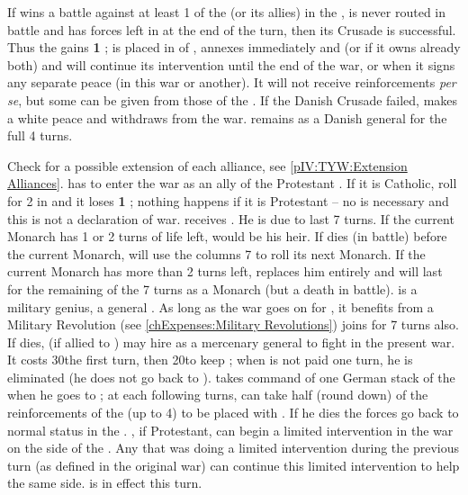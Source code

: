 \bparag If \DANdan wins a battle against at least 1 \ARMY\faceplus of the
\ligue (or its allies) in the \HRE, is never routed in battle and has forces
left in \HRE at the end of the turn, then its Crusade is successful.
\bparag Thus the \alliance gains {\bf 1} \STAB ; \DANmin is placed in \EG of
\ENG, annexes immediately \provinceLubeck and \provinceHolstein (or
\provinceMecklenburg if it owns already both) and will continue its
intervention until the end of the war, or when it signs any separate peace (in
this war or another). It will not receive reinforcements \emph{per se}, but
some can be given from those of the \alliance.
\bparag If the Danish Crusade failed, \DANmin makes a white peace and
withdraws from the war.  remains as a Danish general for
the full 4 turns.


\phevnt
\aparag Check for a possible extension of each alliance, see
\ref{pIV:TYW:Extension Alliances}.
\aparag \SUE has to enter the war as an ally of the Protestant \alliance.  If
it is Catholic, roll for 2 \REVOLT in \SUE and it loses {\bf 1} \STAB ;
nothing happens if it is Protestant -- no \CB is necessary and this is not a
declaration of war.
 \SUE receives . He is
due to last 7 turns.
\bparag If the current Monarch has 1 or 2 turns of life left,
 would be his heir. If 
dies (in battle) before the current Monarch, \SUE will use the columns 7 to
roll its next Monarch.
\bparag If the current Monarch has more than 2 turns left,  replaces him entirely and will last for the remaining of the 7
turns as a Monarch (but a death in battle).
\bparag {} is a military genius, a general
. As long as the war goes on for \SUE, it
benefits from a Military Revolution (see \ref{chExpenses:Military
  Revolutions})
\label{pIV:TYW:Saxe-Weimar}
 joins \SUE for 7 turns also.
\bparag If  dies, \FRA (if allied to \SUE) may hire
 as a mercenary general to fight in the present war.  It
costs 30\ducats the first turn, then 20\ducats to keep ;
when  is not paid one turn, he is eliminated (he does not
go back to \SUE).  takes command of one German stack of
the \alliance when he goes to \FRA; at each following turns, \FRA can take
half (round down) of the reinforcements of the \alliance (up to 4\LD) to be
placed with .  If he dies the forces go back to normal
status in the \alliance.
\aparag \FRA, if Protestant, can begin a limited intervention in the war on
the side of the \alliance.
\aparag Any \MAJ that was doing a limited intervention during the previous
turn (as defined in the original war) can continue this limited intervention
to help the same side.
\aparag {} is in effect this turn.


